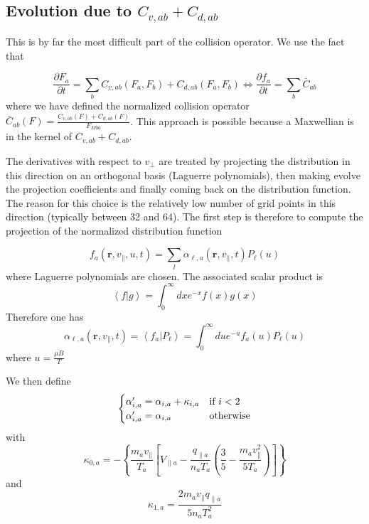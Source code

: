 \documentclass[11pt,preprint]{elsarticle}
\begin{document}
\subsection{Evolution due to $C_{v,ab}+C_{d,ab}$ }


This is by far the most difficult part of the collision operator. We use the fact that

\begin{equation}
\frac{\partial F_{a}}{\partial t}=\sum_{b}C_{v,ab}\left(F_{a},F_{b}\right)+C_{d,ab}\left(F_{a},F_{b}\right)\Leftrightarrow\frac{\partial f_{a}}{\partial t}=\sum_{b}\bar{C}{}_{ab}\label{eq:equation=0000E0resoudre}
\end{equation}
where we have defined the normalized collision operator $\bar{C}_{ab}(F)=\frac{C_{v,ab}(F)+C_{d,ab}(F)}{F_{M0a}}$.
This approach is possible because a Maxwellian is in the kernel of $C_{v,ab}+C_{d,ab}$. 

The derivatives with respect to $v_{\perp}$ are treated by projecting the distribution in this direction on an orthogonal basis (Laguerre polynomials), then making evolve the projection coefficients and finally coming back on the distribution function. The reason for this choice is the relatively low number of grid points in this direction (typically between 32 and 64).
The first step is therefore to compute the projection of the normalized distribution function

\[
f_{a}(\boldsymbol{r},v_{\parallel},u,t)=\sum_{l}\alpha_{\ell,a}(\boldsymbol{\boldsymbol{r}},v_{\parallel},t)P_{\ell}(u)
\]
where Laguerre polynomials are chosen. The associated scalar product is
\[
\left\langle f|g\right\rangle =\int_{0}^{\infty}dxe^{-x}f\left(x\right)g\left(x\right)
\]
Therefore one has
\[
\alpha_{\ell,a}(\boldsymbol{\boldsymbol{r}},v_{\parallel},t) = \left\langle f_{a}|P_{\ell}\right\rangle =\int_{0}^{\infty}due^{-u}f_{a}\left(u\right)P_{\ell}\left(u\right)
\]
where $u = \frac{\mu B}{T}$

We then define
\[
\begin{cases}
\alpha'_{i,a}=\alpha_{i,a}+\kappa_{i,a} & \text{if \ensuremath{i<2}}\\
\alpha'_{i,a}=\alpha_{i,a} & \text{otherwise}
\end{cases}
\]
with 
\[
\kappa_{0,a}=-\left\{ \frac{m_{a}v_{\parallel}}{T_{a}}\left[V_{\parallel a}-\frac{q_{\parallel a}}{n_{a}T_{a}}\left(\frac{3}{5}-\frac{m_{a}v_{\parallel}^{2}}{5T_{a}}\right)\right]\right\} 
\]
and
\[
\kappa_{1,a}=\frac{2m_{a}v_{\parallel}q_{\parallel a}}{5n_{a}T_{a}^{2}}
\]
\end{document}
